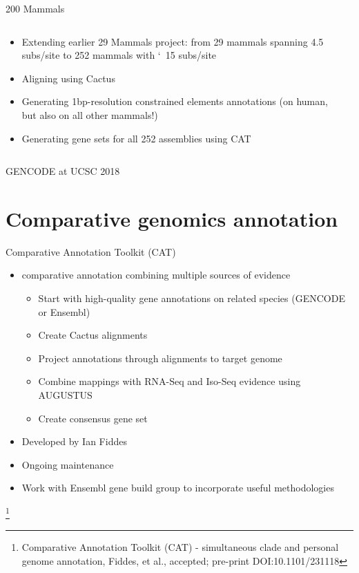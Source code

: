 \documentclass[10pt,
               hyperref={bookmarks=false,
                         bookmarksopen=false,
                         colorlinks=true,
                         linkcolor=blue,
                         urlcolor=blue},
               xcolor={svgnames,table}]{beamer}
\newcommand{\sectionframe}[1]{
  \begin{frame}{\thetitle}
    \section{#1}
  \end{frame}
}
\newcommand\blfootnote[1]{%
  \begingroup
  \renewcommand\thefootnote{}\footnote{#1}%
  \addtocounter{footnote}{-1}%
  \endgroup
}
\newenvironment{tightitemize}{%
\begin{itemize}
  \setlength{\itemsep}{1pt}%
  \setlength{\parskip}{0pt}%
  \setlength{\parsep}{0pt}%
}{\end{itemize}}
\newcommand{\thetitle}{GENCODE at UCSC 2018}
\begin{document}
\begin{frame}{200 Mammals}
  \begin{columns}
    \begin{column}{0.5\textwidth}
      \begin{itemize}
          \item Extending earlier 29 Mammals project: from 29 mammals spanning 4.5 subs/site to 252 mammals with \char`~15 subs/site
          \item Aligning using Cactus
          \item Generating 1bp-resolution constrained elements annotations (on human, but also on all other mammals!)
          \item Generating gene sets for all 252 assemblies using CAT
      \end{itemize}
    \end{column}
    \begin{column}{0.5\textwidth}
    \end{column}
  \end{columns}
\end{frame}

\sectionframe{Comparative genomics annotation}

\begin{frame}{Comparative Annotation Toolkit (CAT)}
  \begin{itemize}
  \item comparative annotation combining multiple sources of evidence
    \begin{tightitemize}
    \item Start with high-quality gene annotations on related species (GENCODE or Ensembl)
    \item Create Cactus alignments
    \item Project annotations through alignments to target genome
    \item Combine mappings with RNA-Seq and Iso-Seq evidence using AUGUSTUS
    \item Create consensus gene set 
    \end{tightitemize}
  \item Developed by Ian Fiddes
  \item Ongoing maintenance 
  \item Work with Ensembl gene build group to incorporate useful methodologies
  \end{itemize}
\blfootnote{Comparative Annotation Toolkit (CAT) - simultaneous clade and personal genome annotation, Fiddes, et al., accepted; pre-print DOI:10.1101/231118}
\end{frame}
\end{document}
